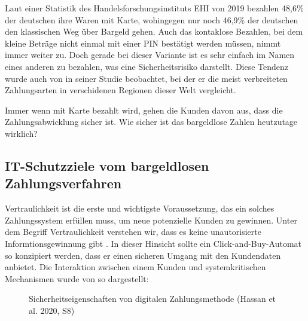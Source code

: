 Laut einer Statistik des Handelsforschungsinstituts EHI von 2019 \cite{refart:KSDL} bezahlen 48,6\% 
der deutschen ihre Waren mit Karte, wohingegen nur noch 46,9\% der deutschen den klassischen 
Weg über Bargeld gehen. Auch das kontaklose Bezahlen, bei dem kleine Beträge nicht einmal mit einer 
PIN bestätigt werden müssen, nimmt immer weiter zu. Doch gerade bei dieser Variante ist es sehr einfach
im Namen eines anderen zu bezahlen, was eine Sicherheitsrisiko darstellt. Diese Tendenz wurde auch
von \cite{refart:TDMP} in seiner Studie beobachtet, bei der er die meist verbreiteten Zahlungsarten
in verschidenen Regionen dieser Welt vergleicht. 


Immer wenn mit Karte bezahlt wird, gehen die Kunden davon aus, dass die Zahlungsabwicklung sicher ist. 
Wie sicher ist das bargeldlose Zahlen heutzutage wirklich? 


\subsection{IT-Schutzziele vom bargeldlosen Zahlungsverfahren}


Vertraulichkeit ist die erste und wichtigste Voraussetzung, das ein solches Zahlungssystem erfüllen muss, 
um neue potenzielle Kunden zu gewinnen. Unter dem Begriff Vertraulichkeit verstehen wir, dass es keine 
unautorisierte Informtionsgewinnung gibt \cite{refbook:SWIS}. In dieser Hinsicht sollte ein Click-and-Buy-Automat
so konzipiert werden, dass er einen sicheren Umgang mit den Kundendaten anbietet. Die Interaktion zwischen
einem Kunden und systemkritischen Mechanismen wurde von \cite{refart:HARE} so dargestellt:

\vfill
\begin{figure}[htb]
    \caption{Sicherheitseigenschaften von digitalen Zahlungsmethode (Hassan et al. 2020, S8)}
    \label{fig:refark_HARE}
\end{figure}
\vfill

